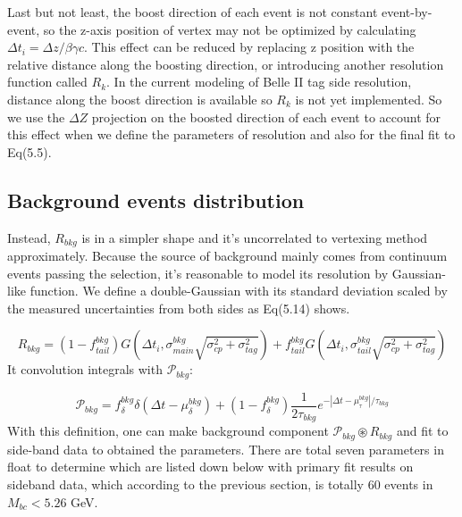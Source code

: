  Last but not least, the boost direction of each event is not constant event-by-event, so the z-axis position of vertex may not be optimized by calculating  $\Delta t_i = \Delta z / \beta\gamma c$. This effect can be reduced by replacing z position with the relative distance along the boosting direction, or introducing another resolution function called $R_k$. In the current modeling of Belle II tag side resolution, distance along the boost direction is available so $R_k$ is not yet implemented. So we use the $\Delta Z$ projection on the boosted direction of each event to account for this effect when we define the parameters of resolution and also for the final fit to Eq(5.5).



\subsection{Background events distribution}
Instead, $R_{bkg}$ is in a simpler shape and it's uncorrelated to vertexing method approximately. Because the source of background mainly comes from continuum events passing the selection, it's reasonable to model its resolution by Gaussian-like function. We define a double-Gaussian with its standard deviation scaled by the measured uncertainties from both sides as Eq(5.14) shows. 

\begin{equation}
R_{bkg} = (1-f^{bkg}_{tail})G(\Delta t_i, \sigma^{bkg}_{main}\sqrt{\sigma^2_{cp}+\sigma^2_{tag}})
+ f^{bkg}_{tail}G(\Delta t_i, \sigma^{bkg}_{tail}\sqrt{\sigma^2_{cp}+\sigma^2_{tag}})
\end{equation} It convolution integrals with $\mathcal{P}_{bkg}$:

\begin{equation}
\mathcal{P}_{bkg}=f_{\delta}^{bkg}\delta(\Delta t - \mu^{bkg}_{\delta})+
(1-f_{\delta}^{bkg})\frac{1}{2\tau_{bkg}}e^{-|\Delta t - \mu^{bkg}_{\tau}|/\tau_{bkg}}
\end{equation}
With this definition, one can make background component $\mathcal{P}_{bkg}\circledast R_{bkg}$ and fit to side-band data to obtained the parameters. There are total seven parameters in float to determine which are listed down below with primary fit results on sideband data, which according to the previous section, is totally 60 events in $M_{bc} <5.26$ GeV.

